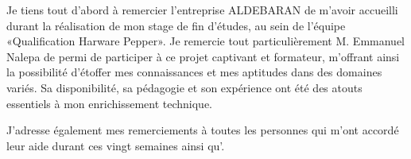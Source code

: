 Je tiens tout d’abord à remercier l’entreprise ALDEBARAN de m’avoir accueilli durant la réalisation de mon stage de fin d'études, au sein de l'équipe «Qualification Harware Pepper».
Je remercie tout particulièrement M. Emmanuel Nalepa de permi de participer à ce projet captivant et formateur, m’offrant ainsi la possibilité d'étoffer mes connaissances et mes aptitudes dans des domaines variés. Sa disponibilité, sa pédagogie et son expérience ont été des atouts essentiels à mon enrichissement technique.

J’adresse également mes remerciements à toutes les personnes qui m’ont accordé leur aide durant ces vingt semaines ainsi qu'.